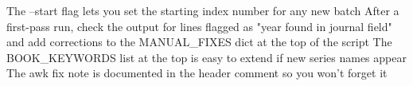 The --start flag lets you set the starting index number for any new batch
After a first-pass run, check the output for lines flagged as "year found in journal field" and add corrections to the MANUAL_FIXES dict at the top of the script
The BOOK_KEYWORDS list at the top is easy to extend if new series names appear
The awk fix note is documented in the header comment so you won't forget it